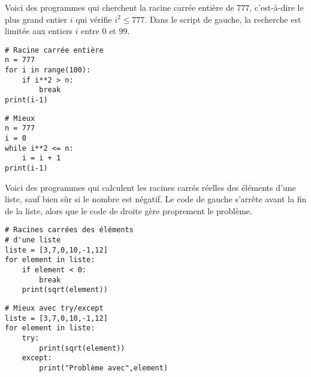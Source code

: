 \documentclass[11pt,class=report,crop=false]{standalone}
\begin{document}
\begin{cours}
\begin{exemple}

Voici des programmes qui cherchent la racine carrée entière de $777$, c'est-à-dire le plus grand entier $i$ qui vérifie $i^2 \le 777$. Dans le script de gauche, la recherche est limitée aux entiers $i$ entre $0$ et $99$.

\begin{minipage}{0.4\textwidth}
\begin{lstlisting}
# Racine carrée entière
n = 777
for i in range(100):
    if i**2 > n:
        break
print(i-1)
\end{lstlisting}
\end{minipage}\qquad\qquad
\begin{minipage}{0.4\textwidth}
\begin{lstlisting}
# Mieux
n = 777
i = 0 
while i**2 <= n:
    i = i + 1
print(i-1) 
\end{lstlisting}
\end{minipage}
\end{exemple}

\begin{exemple}

Voici des programmes qui calculent les racines carrés réelles des éléments d'une liste, sauf bien sûr si le nombre est négatif. Le code de gauche s'arrête avant la fin de la liste, alors que le code de droite gère proprement le problème.

\begin{minipage}{0.4\textwidth}
\begin{lstlisting}
# Racines carrées des éléments 
# d'une liste
liste = [3,7,0,10,-1,12]
for element in liste:
    if element < 0:
        break
    print(sqrt(element))
\end{lstlisting}
\end{minipage}\qquad
\begin{minipage}{0.4\textwidth}
\begin{lstlisting}
# Mieux avec try/except
liste = [3,7,0,10,-1,12]
for element in liste:
    try: 
        print(sqrt(element))
    except:
        print("Problème avec",element)
\end{lstlisting}
\end{minipage}
\end{exemple}


\end{cours}
\end{document}
